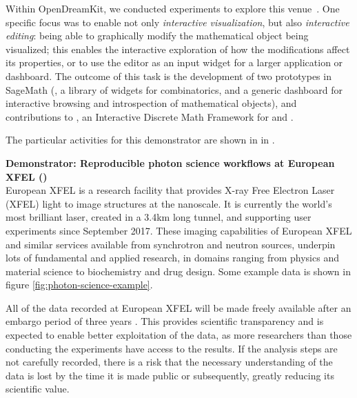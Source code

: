   Within OpenDreamKit, we conducted experiments to explore this
  venue~\cite{ODK_D4.16}. One specific focus was to enable not only
  \emph{interactive visualization}, but also \emph{interactive
    editing}: being able to graphically modify the mathematical object
  being visualized; this enables the interactive exploration of how the
  modifications affect its properties, or to use the editor as an input
  widget for a larger application or dashboard. The outcome of this
  task is the development of two prototypes in SageMath
  (, a library of widgets for
  combinatorics, and  a generic dashboard for
  interactive browsing and introspection of mathematical objects), and
  contributions to , an Interactive Discrete Math
  Framework for  and .

  The particular activities for this demonstrator are shown in
   in .

\medskip
\noindent\textbf{Demonstrator: Reproducible photon science workflows at
  European XFEL ()}\label{sec:concept-demonstrator-photonscience}\\


  European XFEL is a research facility that provides X-ray Free
  Electron Laser (XFEL) light to image structures at the nanoscale. It
  is currently the world's most brilliant laser, created in a 3.4km
  long tunnel, and supporting user experiments since September
  2017. These imaging capabilities of European XFEL and similar
  services available from synchrotron and neutron sources, underpin lots of
  fundamental and applied research, in domains ranging from
  physics and material science to biochemistry and drug design. Some
  example data is shown in figure \ref{fig:photon-science-example}.

  All of the data recorded at European XFEL will be made freely
  available after an embargo period of three years
  \cite{EuXFEL-datapolicy-2017}. This provides scientific transparency
  and is expected to enable better exploitation of the data, as more
  researchers than those conducting the experiments have access to the
  results. If the analysis steps are not carefully recorded, there is a risk
  that the necessary understanding of the data is lost by the time it
  is made public or subsequently, greatly reducing its scientific
  value.

